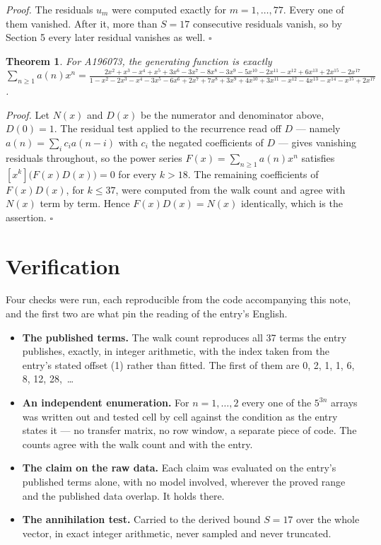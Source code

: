 \documentclass[11pt]{article}
\newtheorem{theorem}{Theorem}
\theoremstyle{definition}
\begin{document}
{\itshape Proof.} The residuals $u_m$ were computed exactly for $m = 1,\dots,77$. Every one of them vanished. After it, more than $S = 17$ consecutive residuals vanish, so by Section 5 every later residual vanishes as well. $\square$

\begin{theorem} For A196073, the generating function is exactly $\sum_{n\ge 1} a(n)x^n = \frac{2x^{2} + x^{3} - x^{4} + x^{5} + 3x^{6} - 3x^{7} - 8x^{8} - 3x^{9} - 5x^{10} - 2x^{11} - x^{12} + 6x^{13} + 2x^{15} - 2x^{17}}{1 - x^{2} - 2x^{3} - x^{4} - 3x^{5} - 6x^{6} + 2x^{7} + 7x^{8} + 3x^{9} + 4x^{10} + 3x^{11} - x^{12} - 4x^{13} - x^{14} - x^{15} + 2x^{17}}$.\end{theorem}

{\itshape Proof.} Let $N(x)$ and $D(x)$ be the numerator and denominator above, $D(0)=1$. The residual test applied to the recurrence read off $D$ --- namely $a(n) = \sum_i c_i a(n-i)$ with $c_i$ the negated coefficients of $D$ --- gives vanishing residuals throughout, so the power series $F(x)=\sum_{n\ge 1}a(n)x^n$ satisfies $[x^k]\bigl(F(x)D(x)\bigr) = 0$ for every $k > 18$. The remaining coefficients of $F(x)D(x)$, for $k \le 37$, were computed from the walk count and agree with $N(x)$ term by term. Hence $F(x)D(x) = N(x)$ identically, which is the assertion. $\square$

\section{Verification}

Four checks were run, each reproducible from the code accompanying this note, and the first two are what pin the reading of the entry's English.

\begin{itemize}

\item {\bfseries The published terms.} The walk count reproduces all 37 terms the entry publishes, exactly, in integer arithmetic, with the index taken from the entry's stated offset (1) rather than fitted. The first of them are 0, 2, 1, 1, 6, 8, 12, 28,~\dots

\item {\bfseries An independent enumeration.} For $n = 1,\dots,2$ every one of the $5^{3n}$ arrays was written out and tested cell by cell against the condition as the entry states it --- no transfer matrix, no row window, a separate piece of code. The counts agree with the walk count and with the entry.

\item {\bfseries The claim on the raw data.} Each claim was evaluated on the entry's published terms alone, with no model involved, wherever the proved range and the published data overlap. It holds there.

\item {\bfseries The annihilation test.} Carried to the derived bound $S = 17$ over the whole vector, in exact integer arithmetic, never sampled and never truncated.

\end{itemize}
\end{document}
